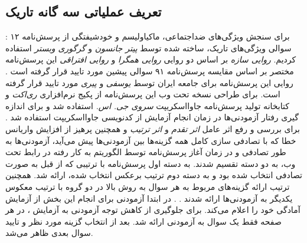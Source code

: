 \subsection{تعریف عملیاتی سه گانه تاریک}
:
برای سنجش ویژگی‌های ضداجتماعی، ماکیاولیسم و خودشیفتگی از پرسش‌نامه ۱۲ سوالی ویژگی‌های تاریک، ساخته شده توسط
\textit{
    پیتر جانسون }
و
\textit{
    گرگوری وبستر}
استفاده کردیم.
\!\citep{jonasonDirtyDozenConcise2010}
\textit{
    روایی سازه
}
بر اساس دو روایی
\textit{
    روایی همگرا
}
و
\textit{
    روایی افتراقی
}
این پرسش‌نامه مختصر بر اساس مقایسه پرسش‌نامه ۹۱ سوالی پیشین مورد تایید قرار گرفته است
\!\citep{jonasonDirtyDozenConcise2010}
\!.
روایی این پرسش‌نامه برای جامعه ایران توسط
\textit{
    یوسفی
}
و
\textit{
    پیری
}
\!\citep{ywsfyWyjgyHyRwn2016}
مورد تایید قرار گرفته است.
برای طراحی نسخه تحت وب این پرسش‌نامه از پکیج نرم‌افزاری
\textit{
    ری‌اکت
}
و کتابخانه تولید پرسش‌نامه جاوااسکریپت
\textit{
    سروی جی. اس.
}
استفاده شد و برای اندازه گیری رفتار آزمودنی‌ها در زمان انجام آزمایش از کدنویسی جاوااسکریپت استفاده شد
\!.
برای بررسی و رفع اثر عامل
\textit{
    اثر تقدم
}
و
\textit{
    اثر ترتیب
}
\!\citep{dillmanMultipleAnswerQuestions2003,krosnickEVALUATIONCOGNITIVETHEORY1987,leeEffectQuestionOrder2009}
و همچنین پرهیز از افزایش واریانس خطا که
با تصادفی سازی کامل همه گزینه‌ها بین آزمودنی‌ها پیش می‌آید،
\!\citep{dillmanMultipleAnswerQuestions2003}
آزمودنی‌ها به طور تصادفی و در زمان آغاز پرسش‌نامه
توسط الگوریتم به کار رفته در رابط تحت وب، به دو دسته تقسیم
شدند. به دسته اول پرسش‌نامه با ترتیبی که از قبل به
صورت تصادفی انتخاب شده بود و به دسته دوم ترتیب برعکس  انتخاب شده،
ارائه شد. همچنین ترتیب
ارائه گزینه‌های مربوط به هر سوال به روش بالا در دو گروه با ترتیب معکوس یکدیگر به آزمودنی‌ها ارائه شدند
{\citep{dayOrderingEffectsChoice2012}}
{.}
{.}
در ابتدا آزمودنی برای انجام این بخش از آزمایش آمادگی خود را اعلام می‌کند.
برای جلوگیری از کاهش توجه آزمودنی به آزمایش
\!\citep{meadeIdentifyingCarelessResponses2012}
،
در هر صفحه فقط یک سوال به آزمودنی ارائه شد.
بعد از انتخاب گزینه مورد نظر و تایید سوال بعدی ظاهر می‌شد.
